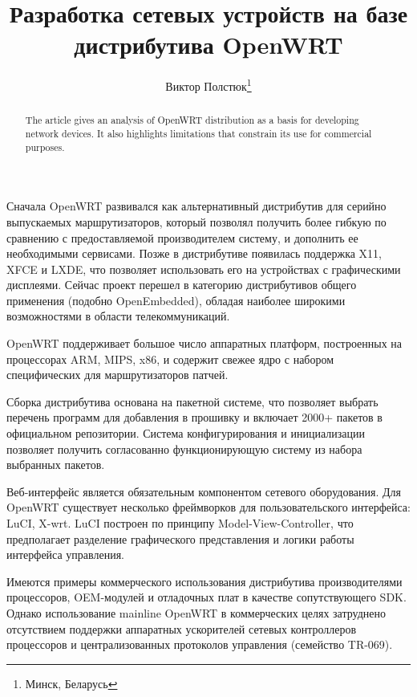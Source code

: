 \documentclass[10pt, a5paper]{article}
\begin{document}
\title{Разработка сетевых устройств на базе дистрибутива OpenWRT}%

\author{Виктор Полстюк\footnote{Минск, Беларусь}}
\maketitle

\begin{abstract}
The article gives an analysis of OpenWRT distribution as a basis for developing network devices. It also highlights limitations that constrain its use for commercial purposes.
\end{abstract}


Сначала OpenWRT развивался как альтернативный дистрибутив для серийно выпускаемых маршрутизаторов, который позволял получить более гибкую по сравнению с предоставляемой производителем систему, и дополнить ее необходимыми сервисами. Позже в дистрибутиве появилась поддержка X11, XFCE и LXDE, что позволяет использовать его на устройствах с графическими дисплеями. Сейчас проект перешел в категорию дистрибутивов общего применения (подобно OpenEmbedded), обладая наиболее широкими возможностями в области телекоммуникаций.

OpenWRT поддерживает большое число аппаратных платформ, построенных на процессорах ARM, MIPS, x86, и содержит свежее ядро с набором специфических для маршрутизаторов патчей. 

Сборка дистрибутива основана на пакетной системе, что позволяет выбрать перечень программ для добавления в прошивку и включает 2000+ пакетов в официальном репозитории. Система конфигурирования и инициализации позволяет получить согласованно функционирующую систему из набора выбранных пакетов.

Веб-интерфейс является обязательным компонентом сетевого \linebreak оборудования.  Для OpenWRT существует несколько фреймворков для пользовательского интерфейса: LuCI, X-wrt. LuCI построен по принципу Model-View-Controller, что предполагает разделение графического представления и логики работы интерфейса управления.

Имеются примеры коммерческого использования дистрибутива производителями процессоров, OEM-модулей и отладочных плат в качестве сопутствующего SDK. Однако использование mainline OpenWRT в коммерческих целях затруднено отсутствием поддержки аппаратных ускорителей сетевых контроллеров процессоров и централизованных протоколов управления (семейство TR-069).
\end{document}
